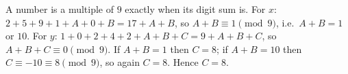 A number is a multiple of $9$ exactly when its digit sum is. For $x$: $2+5+9+1+A+0+B=17+A+B$, so $A+B\equiv1\pmod9$, i.e.\ $A+B=1$ or $10$. For $y$: $1+0+2+4+2+A+B+C=9+A+B+C$, so $A+B+C\equiv0\pmod9$. If $A+B=1$ then $C=8$; if $A+B=10$ then $C\equiv-10\equiv8\pmod9$, so again $C=8$. Hence $C=\boxed{8}$.
